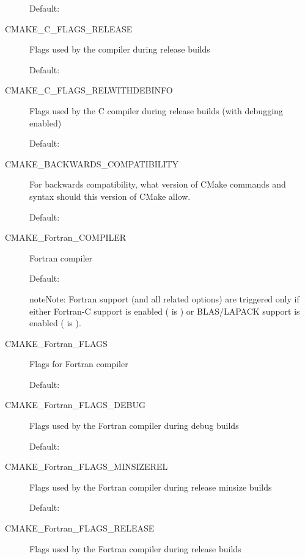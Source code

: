 \documentclass[letterpaper,10pt,english]{sphinxmanual}
\begin{document}
\begin{description}
Default: 

\item[{\index{CMAKE\_C\_FLAGS\_RELEASE (CMake option)}CMAKE\_C\_FLAGS\_RELEASE}] \leavevmode
Flags used by the compiler during release
builds

Default: 

\item[{\index{CMAKE\_C\_FLAGS\_RELWITHDEBINFO (CMake option)}CMAKE\_C\_FLAGS\_RELWITHDEBINFO}] \leavevmode
Flags used by the C compiler during release builds (with
debugging enabled)

Default: 

\item[{\index{CMAKE\_BACKWARDS\_COMPATIBILITY (CMake option)}CMAKE\_BACKWARDS\_COMPATIBILITY}] \leavevmode
For backwards compatibility, what
version of CMake commands and syntax should this version of CMake
allow.

Default: 

\item[{\index{CMAKE\_Fortran\_COMPILER (CMake option)}CMAKE\_Fortran\_COMPILER}] \leavevmode
Fortran compiler

Default: 

\begin{notice}{note}{Note:}
Fortran support (and all related options) are triggered only
if either Fortran-C support is enabled ( is ) or
BLAS/LAPACK support is enabled ( is ).
\end{notice}

\item[{\index{CMAKE\_Fortran\_FLAGS (CMake option)}CMAKE\_Fortran\_FLAGS}] \leavevmode
Flags for Fortran compiler

Default:

\item[{\index{CMAKE\_Fortran\_FLAGS\_DEBUG (CMake option)}CMAKE\_Fortran\_FLAGS\_DEBUG}] \leavevmode
Flags used by the Fortran compiler during debug
builds

Default: 

\item[{\index{CMAKE\_Fortran\_FLAGS\_MINSIZEREL (CMake option)}CMAKE\_Fortran\_FLAGS\_MINSIZEREL}] \leavevmode
Flags used by the Fortran compiler during
release minsize builds

Default: 

\item[{\index{CMAKE\_Fortran\_FLAGS\_RELEASE (CMake option)}CMAKE\_Fortran\_FLAGS\_RELEASE}] \leavevmode
Flags used by the Fortran compiler during
release builds


\end{description}
\end{document}
